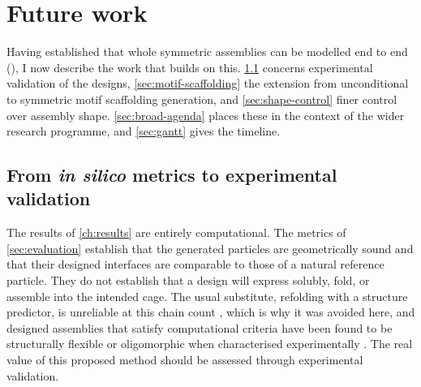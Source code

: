 \chapter{Future work}
\label{ch:future-work}


Having established that whole symmetric assemblies can be modelled end to end
(), I now describe the work that
builds on this. \cref{sec:experimental-validation} concerns experimental
validation of the designs, \cref{sec:motif-scaffolding} the extension
from unconditional to symmetric motif scaffolding generation, and
\cref{sec:shape-control} finer control over assembly shape.
\cref{sec:broad-agenda} places these in the context of the wider research
programme, and \cref{sec:gantt} gives the timeline.


\section{From \emph{in silico} metrics to experimental validation}
\label{sec:experimental-validation}

The results of \cref{ch:results} are entirely computational. The metrics
of \cref{sec:evaluation} establish that the generated particles are
geometrically sound and that their designed interfaces are comparable to those
of a natural reference particle. They do not establish that a design will
express solubly, fold, or assemble into the intended cage. The usual substitute,
refolding with a structure predictor, is unreliable at this chain count
\parencite{bryant_predicting_2022}, which is why it was avoided here, and
designed assemblies that satisfy computational criteria have been found to be
structurally flexible or oligomorphic when characterised experimentally
\parencite{khmelinskaia_local_2025}. The real value of this proposed method should 
be assessed through experimental validation.

